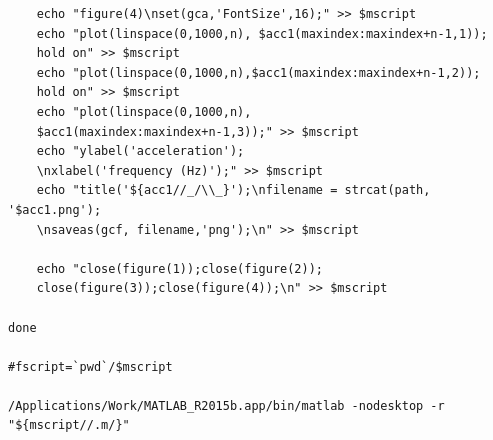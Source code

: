 \documentclass{sigchi}
\begin{document}
\begin{lstlisting}
	echo "figure(4)\nset(gca,'FontSize',16);" >> $mscript
	echo "plot(linspace(0,1000,n), $acc1(maxindex:maxindex+n-1,1)); 
    hold on" >> $mscript
	echo "plot(linspace(0,1000,n),$acc1(maxindex:maxindex+n-1,2)); 
    hold on" >> $mscript
	echo "plot(linspace(0,1000,n),
    $acc1(maxindex:maxindex+n-1,3));" >> $mscript
	echo "ylabel('acceleration');
    \nxlabel('frequency (Hz)');" >> $mscript
	echo "title('${acc1//_/\\_}');\nfilename = strcat(path, '$acc1.png');
    \nsaveas(gcf, filename,'png');\n" >> $mscript

	echo "close(figure(1));close(figure(2));
    close(figure(3));close(figure(4));\n" >> $mscript

done

#fscript=`pwd`/$mscript

/Applications/Work/MATLAB_R2015b.app/bin/matlab -nodesktop -r "${mscript//.m/}"
\end{lstlisting}
\end{document}
